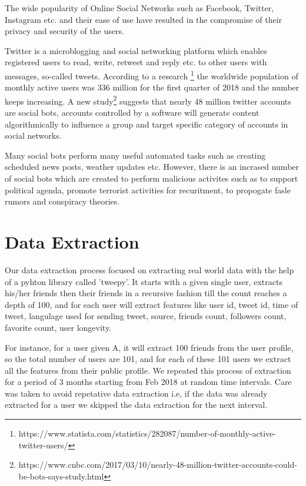 \documentclass[conference]{IEEEtran}
\begin{document}
The wide popularity of Online Social Networks such as Facebook, Twitter, Instagram etc. and their ease of use have resulted in the compromise of their privacy and security of the users. 

Twitter is a microblogging and social networking  platform which enables registered users to read, write, retweet and reply etc. to other users with messages, so-called tweets.
According to a research \footnote{https://www.statista.com/statistics/282087/number-of-monthly-active-twitter-users/} the worldwide population of monthly active users was 336 million for the first quarter of 2018 and the number keeps increasing. A new study\footnote{https://www.cnbc.com/2017/03/10/nearly-48-million-twitter-accounts-could-be-bots-says-study.html} suggests 
that nearly 48 million twitter accounts are social bots, accounts controlled by a software will generate content algorithmically to influence a group and target specific category of accounts in social networks.

Many social bots perform many useful automated tasks such as creating scheduled news posts, weather updates etc. However, there is an incrased number of social bots which are created to perform malicious activites such as to support political agenda, promote terrorist activities for recuritment, to propogate fasle rumors and conspiracy theories. 

\section{Data Extraction}

Our data extraction process focused on extracting real world data with the help of a pyhton library called 'tweepy'. It starts with a given single user, extracts his/her friends then their friends in a recursive fashion till the count reaches a depth of 100, and for each user will extract features like user id, tweet id, time of tweet, langulage used for sending tweet, source, friends count, followers count, favorite count, user longevity.

For instance, for a user given A, it will extract 100 friends from the user profile, so the total number of users are 101, and for each of these 101 users we extract all the features from their public profile. We repeated this process of extraction for a period of 3 months starting from Feb 2018 at random time intervals. Care was taken to avoid repetative data extraction i.e, if the data was already extracted for a user we skipped the data extraction for the next interval.
\end{document}
